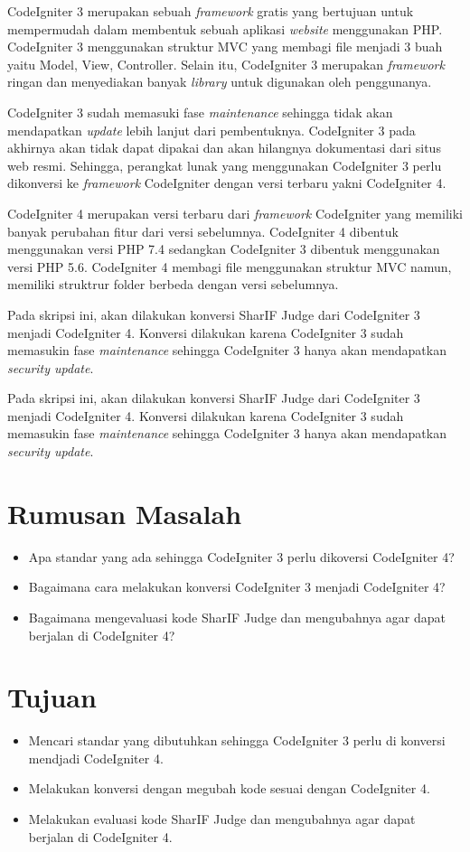 \documentclass[a4paper,twoside]{article}
\begin{document}
CodeIgniter 3 merupakan sebuah \textit{framework} gratis yang bertujuan untuk mempermudah dalam membentuk sebuah aplikasi \textit{website} menggunakan PHP. CodeIgniter 3 menggunakan struktur MVC yang membagi file menjadi 3 buah yaitu Model, View, Controller. Selain itu, CodeIgniter 3 merupakan \textit{framework} ringan dan menyediakan banyak \textit{library} untuk digunakan oleh penggunanya. 

CodeIgniter 3 sudah memasuki fase \textit{maintenance} sehingga tidak akan mendapatkan \textit{update} lebih lanjut dari pembentuknya. CodeIgniter 3 pada akhirnya akan tidak dapat dipakai dan akan hilangnya dokumentasi dari situs web resmi. Sehingga, perangkat lunak yang menggunakan CodeIgniter 3 perlu dikonversi ke \textit{framework} CodeIgniter dengan versi terbaru yakni CodeIgniter 4.

CodeIgniter 4 merupakan versi terbaru dari \textit{framework} CodeIgniter yang memiliki banyak perubahan fitur dari versi sebelumnya. CodeIgniter 4 dibentuk menggunakan versi PHP 7.4 sedangkan CodeIgniter 3 dibentuk menggunakan versi PHP 5.6. CodeIgniter 4 membagi file menggunakan struktur MVC namun, memiliki struktrur folder berbeda dengan versi sebelumnya.

Pada skripsi ini, akan dilakukan konversi SharIF Judge dari CodeIgniter 3 menjadi CodeIgniter 4. Konversi dilakukan karena CodeIgniter 3 sudah memasukin fase \textit{maintenance} sehingga CodeIgniter 3 hanya akan mendapatkan \textit{security update}.

Pada skripsi ini, akan dilakukan konversi SharIF Judge dari CodeIgniter 3 menjadi CodeIgniter 4. Konversi dilakukan karena CodeIgniter 3 sudah memasukin fase \textit{maintenance} sehingga CodeIgniter 3 hanya akan mendapatkan \textit{security update}.

\section{Rumusan Masalah}
\begin{itemize}
	\item Apa standar yang ada sehingga CodeIgniter 3 perlu dikoversi CodeIgniter 4?
	\item Bagaimana cara melakukan konversi CodeIgniter 3 menjadi CodeIgniter 4?
	\item Bagaimana mengevaluasi kode SharIF Judge dan mengubahnya agar dapat berjalan di CodeIgniter 4?
\end{itemize}

\section{Tujuan}
\begin{itemize}
	\item Mencari standar yang dibutuhkan sehingga CodeIgniter 3 perlu di konversi mendjadi CodeIgniter 4.
	\item Melakukan konversi dengan megubah kode sesuai dengan CodeIgniter 4.
	\item Melakukan evaluasi kode SharIF Judge dan mengubahnya agar dapat berjalan di CodeIgniter 4.
\end{itemize}
\end{document}
